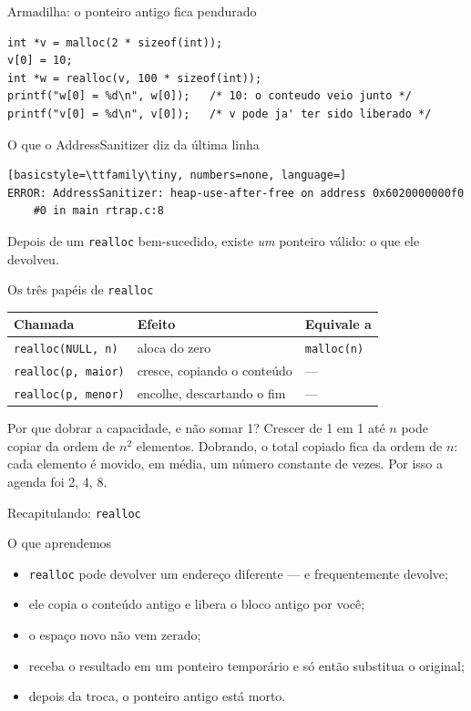 \documentclass[aspectratio=169]{beamer}
\begin{document}
\begin{frame}[fragile]{Armadilha: o ponteiro antigo fica pendurado}
\begin{lstlisting}[basicstyle=\ttfamily\scriptsize]
int *v = malloc(2 * sizeof(int));
v[0] = 10;
int *w = realloc(v, 100 * sizeof(int));
printf("w[0] = %d\n", w[0]);   /* 10: o conteudo veio junto */
printf("v[0] = %d\n", v[0]);   /* v pode ja' ter sido liberado */
\end{lstlisting}
  \begin{alertblock}{O que o AddressSanitizer diz da última linha}
\begin{lstlisting}[basicstyle=\ttfamily\tiny, numbers=none, language=]
ERROR: AddressSanitizer: heap-use-after-free on address 0x6020000000f0
    #0 in main rtrap.c:8
\end{lstlisting}
    Depois de um \texttt{realloc} bem-sucedido, existe \emph{um} ponteiro
    válido: o que ele devolveu.
  \end{alertblock}
\end{frame}

\begin{frame}{Os três papéis de \texttt{realloc}}
  \begin{center}
  \small
  \begin{tabular}{lll}
    \toprule
    Chamada & Efeito & Equivale a \\
    \midrule
    \texttt{realloc(NULL, n)} & aloca do zero              & \texttt{malloc(n)} \\
    \texttt{realloc(p, maior)} & cresce, copiando o conteúdo & --- \\
    \texttt{realloc(p, menor)} & encolhe, descartando o fim  & --- \\
    \bottomrule
  \end{tabular}
  \end{center}
  \begin{exampleblock}{Por que dobrar a capacidade, e não somar 1?}
    Crescer de 1 em 1 até $n$ pode copiar da ordem de $n^2$ elementos.
    Dobrando, o total copiado fica da ordem de $n$: cada elemento é movido, em
    média, um número constante de vezes. Por isso a agenda foi 2, 4, 8.
  \end{exampleblock}
\end{frame}

\begin{frame}{Recapitulando: \texttt{realloc}}
  \begin{block}{O que aprendemos}
    \begin{itemize}
      \item \texttt{realloc} pode devolver um endereço diferente --- e
        frequentemente devolve;
      \item ele copia o conteúdo antigo e libera o bloco antigo por você;
      \item o espaço novo não vem zerado;
      \item receba o resultado em um ponteiro temporário e só então substitua o
        original;
      \item depois da troca, o ponteiro antigo está morto.
    \end{itemize}
  \end{block}
\end{frame}
\end{document}
